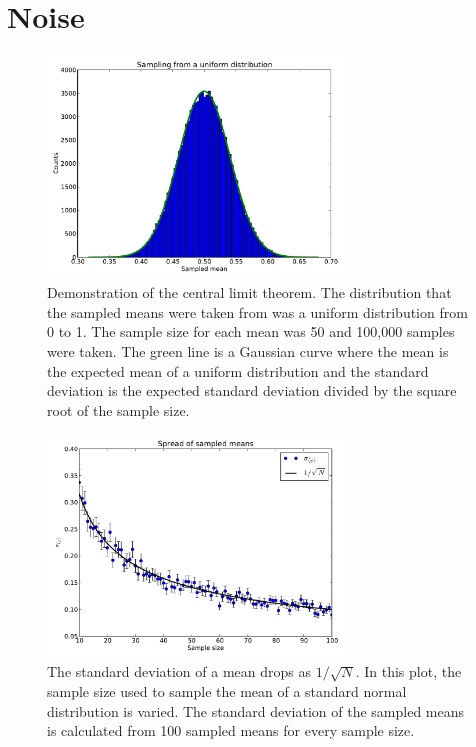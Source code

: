 \documentclass[11pt,letterpaper]{article}
\begin{document}
\section{Noise}

\begin{figure}
    \centering
    \includegraphics[width=0.7\textwidth]{figures/cl_uniform.pdf}
    \caption{Demonstration of the central limit theorem. The distribution that
    the sampled means were taken from was a uniform distribution from 0 to 1.
    The sample size for each mean was 50 and 100,000 samples were taken. The
    green line is a Gaussian curve where the mean is the expected mean of a
    uniform distribution and the standard deviation is the expected standard
    deviation divided by the square root of the sample size.}
    \label{cl_thm}
\end{figure}

\begin{figure}
    \centering
    \includegraphics[width=0.7\textwidth]{figures/root_n.pdf}
    \caption{The standard deviation of a mean drops as $1 / \sqrt{N}$. In this
    plot, the sample size used to sample the mean of a standard normal
    distribution is varied. The standard deviation of the sampled means is
    calculated from 100 sampled means for every sample size.}
    \label{root_n}
\end{figure}
\end{document}
